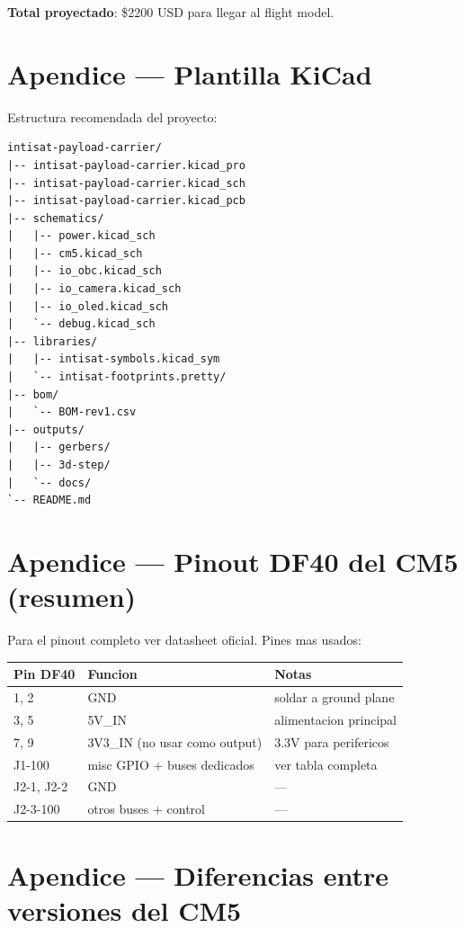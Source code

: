 \documentclass[11pt,a4paper,oneside,openright]{book}
\begin{document}
\textbf{Total proyectado}: \$2200 USD para llegar al flight model.

\appendix
\chapter{Apendice --- Plantilla KiCad}

Estructura recomendada del proyecto:

\begin{lstlisting}
intisat-payload-carrier/
|-- intisat-payload-carrier.kicad_pro
|-- intisat-payload-carrier.kicad_sch
|-- intisat-payload-carrier.kicad_pcb
|-- schematics/
|   |-- power.kicad_sch
|   |-- cm5.kicad_sch
|   |-- io_obc.kicad_sch
|   |-- io_camera.kicad_sch
|   |-- io_oled.kicad_sch
|   `-- debug.kicad_sch
|-- libraries/
|   |-- intisat-symbols.kicad_sym
|   `-- intisat-footprints.pretty/
|-- bom/
|   `-- BOM-rev1.csv
|-- outputs/
|   |-- gerbers/
|   |-- 3d-step/
|   `-- docs/
`-- README.md
\end{lstlisting}

\chapter{Apendice --- Pinout DF40 del CM5 (resumen)}

Para el pinout completo ver datasheet oficial. Pines mas usados:

\begin{center}
\small
\begin{tabular}{lll}
\toprule
\textbf{Pin DF40} & \textbf{Funcion} & \textbf{Notas} \\
\midrule
1, 2         & GND                                 & soldar a ground plane \\
3, 5         & 5V\_IN                              & alimentacion principal \\
7, 9         & 3V3\_IN (no usar como output)       & 3.3V para perifericos \\
J1-100       & misc GPIO + buses dedicados         & ver tabla completa \\
J2-1, J2-2   & GND                                 & --- \\
J2-3-100     & otros buses + control               & --- \\
\bottomrule
\end{tabular}
\end{center}

\chapter{Apendice --- Diferencias entre versiones del CM5}
\end{document}
